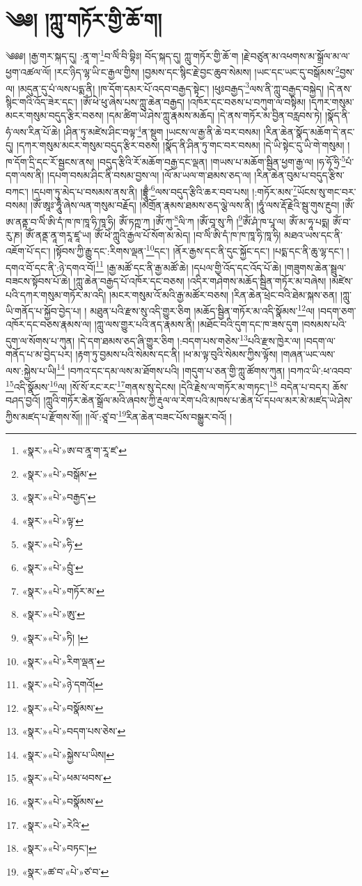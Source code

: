 \chapter{༄༅། །ཀླུ་གཏོར་གྱི་ཆོ་ག།}༄༅༅། །རྒྱ་གར་སྐད་དུ། :ནཱ་ག་\footnote{«སྣར་»«པེ་»ཨ་བ་ནཱ་ག་རཱ་ཛ་}བ་ལིཾ་བི་བྷིཿ། བོད་སྐད་དུ། ཀླུ་གཏོར་གྱི་ཆོ་ག །རྗེ་བཙུན་མ་འཕགས་མ་སྒྲོལ་མ་ལ་ཕྱག་འཚལ་ལོ། །རང་ཉིད་ལྷ་ཡི་ང་རྒྱལ་གྱིས། །བྱམས་དང་སྙིང་རྗེ་བྱང་ཆུབ་སེམས། །ཡང་དང་ཡང་དུ་བསྒོམས་\footnote{«སྣར་»«པེ་»བསྒོམ་}བྱས་ལ། །མདུན་དུ་པཾ་ལས་པདྨ་ནི། །ཁ་དོག་དམར་པོ་འདབ་བརྒྱད་སྟེང་། །ཕུཿབརྒྱད་\footnote{«སྣར་»«པེ་»བརྒྱད་}ལས་ནི་ཀླུ་བརྒྱད་བསྐྱེད། །དེ་ནས་སྙིང་གའི་འོད་ཟེར་དང་། །ཨོཾ་ཕེ་ཕུ་ཞེས་པས་ཀླུ་ཆེན་བརྒྱད། །འཁོར་དང་བཅས་པ་བཀུག་ལ་བསྟིམ། །དཀར་གསུམ་མངར་གསུམ་བདུད་རྩིར་བཅས། །དམ་ཚིག་ཡེ་ཤེས་ཀླུ་རྣམས་མཆོད། །དེ་ནས་གཏོར་མ་བྱིན་བརླབས་ཏེ། །སྣོད་ནི་ཧཾ་ལས་རིན་པོ་ཆེ། །ཤིན་ཏུ་མཛེས་ཤིང་བལྟ་\footnote{«སྣར་»«པེ་»ལྟ་}ན་སྡུག །ཡངས་ལ་རྒྱ་ནི་ཆེ་བར་བསམ། །རིན་ཆེན་སྣོད་མཆོག་དེ་ནང་དུ། །དཀར་གསུམ་མངར་གསུམ་བདུད་རྩིར་བཅས། །སྣོད་ནི་ཤིན་ཏུ་གང་བར་བསམ། །དེ་ཡི་སྟེང་དུ་ཡི་གེ་གསུམ། །ཁ་དོག་དྲི་དང་རོ་སྦྱངས་ནས། །བདུད་རྩིའི་རོ་མཆོག་བརྒྱ་དང་ལྡན། །གཡས་པ་མཆོག་སྦྱིན་ཕྱག་རྒྱ་ལ། །ཧ་ཧོ་ཧྲི་\footnote{«སྣར་»«པེ་»ཧི་}པཾ་དག་ལས་ནི། །དཔག་བསམ་ཤིང་ནི་བསམ་བྱས་ལ། །ལོ་མ་ཡལ་ག་ཐམས་ཅད་ལ། །རིན་ཆེན་བུམ་པ་བདུད་རྩིས་བཀང་། །དཔག་ཏུ་མེད་པ་བསམས་ནས་ནི། །བྷྲཱུྃ་\footnote{«སྣར་»«པེ་»བྲུཾ་}ལས་བདུད་རྩིའི་ཆར་བབ་པས། །:གཏོར་མས་\footnote{«སྣར་»«པེ་»གཏོར་མ་}ཡོངས་སུ་གང་བར་བསམ། །ཨོཾ་ཨཱཿ་ཧཱུྃ་ཞེས་ལན་གསུམ་བརྗོད། །མགྲོན་རྣམས་ཐམས་ཅད་ལྕེ་ལས་ནི། །ཧཱུཾ་ལས་རྡོ་རྗེའི་སྦུ་གུས་རྔུབ། །ཨོཾ་ཨ་ནནྟ་བ་ལིཾ་ཨི་དཾ་ཁ་ཁ་ཁཱ་ཧི་ཁཱ་ཧི། ཨོཾ་ཏཀྵ་ཀ །ཨོཾ་ཀུ་\footnote{«སྣར་»«པེ་»ཨུ་}ལི་ཀ །ཨོཾ་བཱ་སུ་ཀི །\footnote{«སྣར་»«པེ་»ཏི། །}ཨོཾ་ཤཾ་ཁ་པཱ་ལ། ཨོཾ་མ་ཧཱ་པདྨ། ཨོཾ་བ་རུ་ཎ། ཨོཾ་ནནྡ་ནཱ་གརཱ་ཛཱ་ཡ། ཨོཾ་ཕེཾ་ཀླུའི་རྒྱལ་པོ་སོག་མ་མེད། །བ་ལིཾ་ཨི་དཾ་ཁ་ཁ་ཁཱ་ཧི་ཁཱ་ཧི། མཐའ་ཡས་དང་ནི་འཇོག་པོ་དང་། །སྟོབས་ཀྱི་རྒྱུ་དང་:རིགས་ལྡན་\footnote{«སྣར་»«པེ་»རིག་ལྡན་}དང་། །ནོར་རྒྱས་དང་ནི་དུང་སྐྱོང་དང་། །པདྨ་དང་ནི་ཆུ་ལྷ་དང་། །དགའ་བོ་དང་ནི་:ཉེ་དགའ་བོ།\footnote{«སྣར་»«པེ་»ཉེ་དགའོ།} །རྒྱ་མཚོ་དང་ནི་རྒྱ་མཚོ་ཆེ། །དཔལ་གྱི་འོད་དང་འོད་པོ་ཆེ། །གཟུགས་ཆེན་སྦྲུལ་བཟངས་སྟོབས་པོ་ཆེ། །ཀླུ་ཆེན་བརྒྱད་པོ་འཁོར་དང་བཅས། །འདིར་གཤེགས་མཆོད་སྦྱིན་གཏོར་མ་བཞེས། །མཛེས་པའི་དཀར་གསུམ་གཏོར་མ་འདི། །མངར་གསུམ་འོ་མའི་རྒྱ་མཚོར་བཅས། །རིན་ཆེན་ཕྲེང་བའི་ཐེམ་སྐས་ཅན། །ཀླུ་ཡི་གནོད་པ་སྐྱོབ་བྱེད་པ། །
མཐུན་པའི་རྫས་སུ་འདི་གྱུར་ཅིག །མཆོད་སྦྱིན་གཏོར་མ་འདི་སྣོམས་\footnote{«སྣར་»«པེ་»བསྣོམས་}ལ། །བདག་ཅག་འཁོར་དང་བཅས་རྣམས་ལ། །ཀླུ་ལས་གྱུར་པའི་ནད་རྣམས་ནི། །མཐོང་བའི་དུག་དང་ཁ་ཟས་དུག །བསམས་པའི་དུག་ལ་སོགས་པ་ཀུན། །དེ་དག་ཐམས་ཅད་ཞི་གྱུར་ཅིག །:བདག་པས་གཅེས་\footnote{«སྣར་»«པེ་»བདག་པས་ཅེས་}པའི་རྫས་ཁྱེར་ལ། །བདག་ལ་གནོད་པ་མ་བྱེད་པར། །རྟག་ཏུ་བྱམས་པའི་སེམས་དང་ནི། །ཕ་མ་ལྟ་བུའི་སེམས་ཀྱིས་ལྟོས། །གཞན་ཡང་ལས་ལས་:སྐྱེས་པ་ཡི།\footnote{«སྣར་»«པེ་»སྐྱེས་པ་ཡིས།} །བཀའ་དང་དམ་ལས་མ་ཐོགས་པའི། །གདུག་པ་ཅན་གྱི་ཀླུ་ཚོགས་ཀུན། །བཀའ་ཡི་:ཕ་འབབ་\footnote{«སྣར་»«པེ་»ཕམ་ཕབས་}འདི་སྣོམས་\footnote{«སྣར་»«པེ་»བསྣོམས་}ལ། །སོ་སོ་རང་རང་\footnote{«སྣར་»«པེ་»རེའི་}གནས་སུ་དེངས། །དེའི་རྗེས་ལ་གཏོར་མ་གཏང་།\footnote{«སྣར་»«པེ་»བཏང་།} བདེན་པ་བདར། ཆོས་བཤད་བྱའོ། །ཀླུའི་གཏོར་ཆེན་སྒྲོལ་མའི་ཞབས་ཀྱི་རྡུལ་ལ་རེག་པའི་མཁས་པ་ཆེན་པོ་དཔལ་མར་མེ་མཛད་ཡེ་ཤེས་ཀྱིས་མཛད་པ་རྫོགས་སོ།། །།ལོ་:ཙཱ་བ་\footnote{«སྣར་»ཚ་བ་«པེ་»ཙ་བ་}རིན་ཆེན་བཟང་པོས་བསྒྱུར་བའོ། ། 